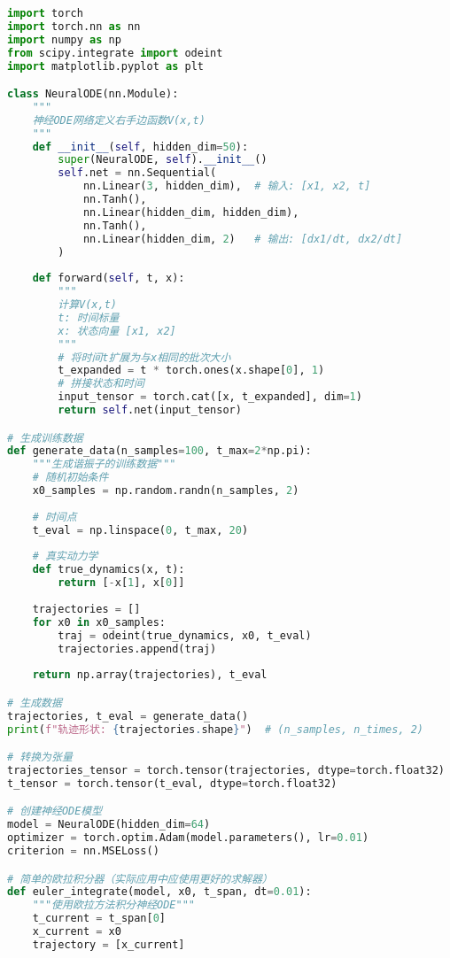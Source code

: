 \begin{lstlisting}[language=Python, caption={神经ODE学习动力学系统的PyTorch实现}, label=code:neural_ode_example]
import torch
import torch.nn as nn
import numpy as np
from scipy.integrate import odeint
import matplotlib.pyplot as plt

class NeuralODE(nn.Module):
    """
    神经ODE网络定义右手边函数V(x,t)
    """
    def __init__(self, hidden_dim=50):
        super(NeuralODE, self).__init__()
        self.net = nn.Sequential(
            nn.Linear(3, hidden_dim),  # 输入: [x1, x2, t]
            nn.Tanh(),
            nn.Linear(hidden_dim, hidden_dim),
            nn.Tanh(),
            nn.Linear(hidden_dim, 2)   # 输出: [dx1/dt, dx2/dt]
        )
    
    def forward(self, t, x):
        """
        计算V(x,t)
        t: 时间标量
        x: 状态向量 [x1, x2]
        """
        # 将时间t扩展为与x相同的批次大小
        t_expanded = t * torch.ones(x.shape[0], 1)
        # 拼接状态和时间
        input_tensor = torch.cat([x, t_expanded], dim=1)
        return self.net(input_tensor)

# 生成训练数据
def generate_data(n_samples=100, t_max=2*np.pi):
    """生成谐振子的训练数据"""
    # 随机初始条件
    x0_samples = np.random.randn(n_samples, 2)
    
    # 时间点
    t_eval = np.linspace(0, t_max, 20)
    
    # 真实动力学
    def true_dynamics(x, t):
        return [-x[1], x[0]]
    
    trajectories = []
    for x0 in x0_samples:
        traj = odeint(true_dynamics, x0, t_eval)
        trajectories.append(traj)
    
    return np.array(trajectories), t_eval

# 生成数据
trajectories, t_eval = generate_data()
print(f"轨迹形状: {trajectories.shape}")  # (n_samples, n_times, 2)

# 转换为张量
trajectories_tensor = torch.tensor(trajectories, dtype=torch.float32)
t_tensor = torch.tensor(t_eval, dtype=torch.float32)

# 创建神经ODE模型
model = NeuralODE(hidden_dim=64)
optimizer = torch.optim.Adam(model.parameters(), lr=0.01)
criterion = nn.MSELoss()

# 简单的欧拉积分器（实际应用中应使用更好的求解器）
def euler_integrate(model, x0, t_span, dt=0.01):
    """使用欧拉方法积分神经ODE"""
    t_current = t_span[0]
    x_current = x0
    trajectory = [x_current]
    

\end{lstlisting}
